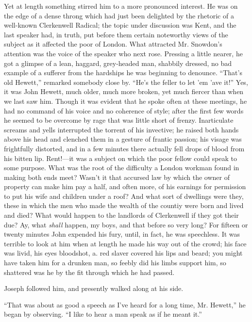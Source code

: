 Yet at length something stirred him to a more pronounced interest. He
was on the edge of a dense throng which had just been delighted by the
rhetoric of a well-known Clerkenwell Radical; the topic under discussion
was Kent, and the last speaker had, in truth, put before them certain
noteworthy views of the subject as it affected the poor of London. What
attracted Mr. Snowdon's attention was the voice of the speaker who next
rose. Pressing a little nearer, he got a glimpse of a lean, haggard,
grey-headed man, shabbily dressed, no bad example of a sufferer from the
hardships he was beginning to denounce. ``That's old Hewett,'' remarked
somebody close by. ``He's the feller to let 'em 'ave it!'' Yes, it was
John Hewett, much older, much more broken, yet much fiercer than when we
last saw him. Though it was evident that he spoke often at these
meetings, he had no command of his voice {}and no coherence of style;
after the first few words he seemed to be overcome by rage that was
little short of frenzy. Inarticulate screams and yells interrupted the
torrent of his invective; he raised both hands above his head and
clenched them in a gesture of frantic passion; his visage was
frightfully distorted, and in a few minutes there actually fell drops of
blood from his bitten lip. Rent!---it was a subject on which the poor
fellow could speak to some purpose. What was the root of the difficulty
a London workman found in making both ends meet? Wasn't it that accursed
law by which the owner of property can make him pay a half, and often
more, of his earnings for permission to put his wife and children under
a roof? And what sort of dwellings were they, these in which the men who
made the wealth of the countiy were born and lived and died? What would
happen to the landlords of Clerkenwell if they got their due? Ay, what
\emph{shall} happen, my boys, and that before so very long? For fifteen
or twenty minutes John expended his {}fury, until, in fact, he was
speechless. It was terrible to look at him when at length he made his
way out of the crowd; his face was livid, his eyes bloodshot, a. red
slaver covered his lips and beard; you might have taken him for a
drunken man, so feebly did his limbs support him, so shattered was he by
the fit through which he had passed.

Joseph followed him, and presently walked along at his side.

``That was about as good a speech as I've heard for a long time, Mr.
Hewett,'' he began by observing. ``I like to hear a man speak as if he
meant it.''

